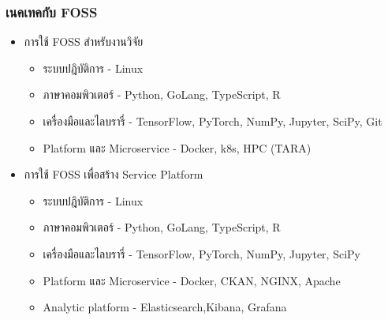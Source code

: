 \begin{frame} [t]
  \frametitle{เนคเทคกับ FOSS}

  \begin{itemize}
    \item การใช้ FOSS สำหรับงานวิจัย
          \begin{itemize}
            \item  ระบบปฎิบัติการ - Linux
            \item ภาษาคอมพิวเตอร์ - Python, GoLang, TypeScript, R
            \item เครื่องมือและไลบรารี่ - TensorFlow, PyTorch, NumPy, Jupyter, SciPy, Git
            \item Platform และ Microservice - Docker, k8s, HPC (TARA)
          \end{itemize}
    \item การใช้ FOSS เพื่อสร้าง Service Platform
          \begin{itemize}
            \item  ระบบปฎิบัติการ - Linux
            \item ภาษาคอมพิวเตอร์ - Python, GoLang, TypeScript, R
            \item เครื่องมือและไลบรารี่ - TensorFlow, PyTorch, NumPy, Jupyter, SciPy
            \item Platform และ Microservice - Docker, CKAN, NGINX, Apache
            \item Analytic platform - Elasticsearch,Kibana, Grafana
          \end{itemize}
  \end{itemize}

\end{frame}